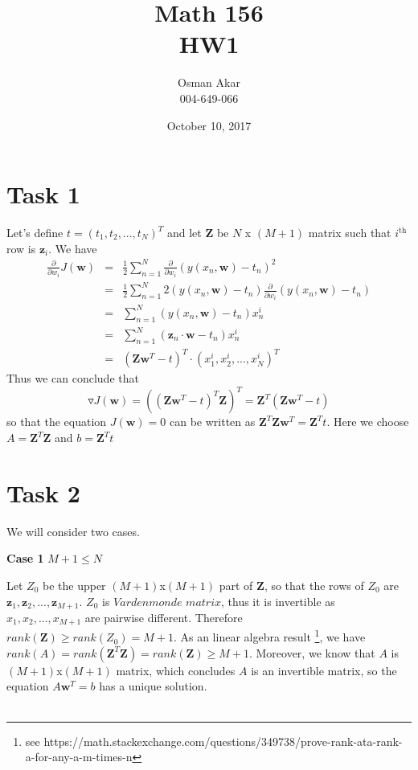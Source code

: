 \documentclass[a4paper,10pt]{article}
\author{Osman Akar \\ 004-649-066}
\date{October 10, 2017}
\title{Math 156 \\ HW1 }
\begin{document}
	
\setlength{\parindent}{4em}
\setlength{\parskip}{1em}

\maketitle



\section*{Task 1}
Let's define $t=(t_1,t_2,...,t_N)^T$ and let $\textbf{Z}$ be $N$ x $(M+1)$ matrix such that $i^{\text{th}}$ row is $\textbf{z}_i$.
We have \begin{eqnarray*}
	\frac{\partial}{\partial w_i}J(\textbf{w})&=& \frac{1}{2}\sum_{n=1}^{N}\frac{\partial}{\partial w_i}(y(x_n,\textbf{w})-t_n)^2 \\ 
	&=&\frac{1}{2}\sum_{n=1}^{N}2(y(x_n,\textbf{w})-t_n)\frac{\partial}{\partial w_i}(y(x_n,\textbf{w})-t_n)\\
	&=&\sum_{n=1}^{N}(y(x_n,\textbf{w})-t_n)x_n^i	\\
	&=&\sum_{n=1}^{N}(\textbf{z}_n\cdot \textbf{w}-t_n)x_n^i \\
	&=& (\textbf{Z}\textbf{w}^T-t)^T\cdot (x_1^i, x_2^i,...,x_N^i)^T
\end{eqnarray*}
Thus we can conclude that $$\triangledown J(\textbf{w})=((\textbf{Z}\textbf{w}^T-t)^T\textbf{Z})^T=\textbf{Z}^T(\textbf{Z}\textbf{w}^T-t)$$
so that the equation $J(\textbf{w})=0$ can be written as $\textbf{Z}^T\textbf{Z}\textbf{w}^T=\textbf{Z}^Tt$. Here we choose $A=\textbf{Z}^T\textbf{Z}$ and $b=\textbf{Z}^Tt$

\section*{Task 2}

We will consider two cases. 

\textbf{Case 1} $ M+1\le N $

Let $Z_0$ be the upper $(M+1)$x$(M+1)$ part of \textbf{Z}, so that the rows of $Z_0$ are $ \textbf{z}_1,\textbf{z}_2,...,\textbf{z}_{M+1}$. $Z_0$ is $\textit{Vardenmonde matrix}$, thus it is invertible as $x_1,x_2,...,x_{M+1}$ are pairwise different. Therefore $rank(\textbf{Z})\ge rank(Z_0)=M+1$. As an linear algebra result \footnote{see https://math.stackexchange.com/questions/349738/prove-rank-ata-rank-a-for-any-a-m-times-n}, we have $rank(A)=rank(\textbf{Z}^T\textbf{Z})=rank(\textbf{Z}) \ge M+1$. Moreover, we know that $A$ is $(M+1)$x$(M+1)$ matrix, which concludes $A$ is an invertible matrix, so the equation $A\textbf{w}^T=b$ has a unique solution.    \\ \\
\end{document}
